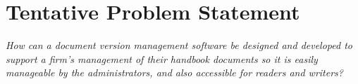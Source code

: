 \section{Tentative Problem Statement} \label{problemstatement}
\textit{How can a document version management software be designed and developed to support a firm's management of their handbook documents so it is easily manageable by the administrators, and also accessible for readers and writers?}
